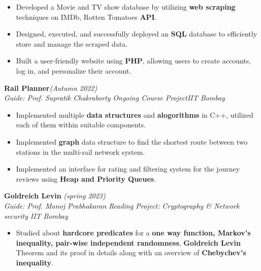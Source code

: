 \documentclass[10 pt]{article}
\begin{document}
		\begin{itemize}[itemsep = -0.8 mm, leftmargin=*]
		\vspace{-16pt}
		\item Developed a Movie and TV show database by utilizing \textbf{web scraping} techniques on IMDb, Rotten Tomatoes \textbf{API}.
		\item Designed, executed, and successfully deployed an \textbf{SQL} database to efficiently store and manage the scraped data.
		\item Built a user-friendly website using \textbf{PHP}, allowing users to create accounts, log in, and personalize their account.
	\end{itemize}
{\selectfont
		\textbf{{Rail Planner}}\hfill{\sl \small (Autumn 2022)}\\
	}{\it Guide: Prof. Supratik Chakraborty \textbar} {\it Ongoing Course Project}\hfill{\sl \small IIT Bombay}\\
	\begin{itemize}[itemsep = -0.8 mm, leftmargin=*]
		\vspace{-16pt}
		\item Implemented multiple \textbf{data structures} and \textbf{alogorithms} in C++, utilized each of them within suitable components.
\item Implemented {\bf graph} data structure to find the shortest route between two stations in the multi-rail network system.
\item Implemented an interface for rating and filtering system for the journey reviews using \textbf{Heap and Priority Queues}.
	\end{itemize}
  	{\selectfont
		\textbf{{Goldreich Levin }}\hfill{\sl \small (spring 2023)}\\
	}{\it Guide: Prof. Manoj Prabhakaran \textbar} {\it Reading Project:  Cryptography \& Network security }\hfill{\sl \small IIT Bombay}\\
	\begin{itemize}[itemsep = -0.8 mm, leftmargin=*]
		\vspace{-16pt}
		\item  Studied about \textbf{hardcore predicates} for a \textbf{one way function, Markov’s inequality, pair-wise
independent randomness}, \textbf{Goldreich Levin} Theorem and its
proof in details along with an overview of \textbf{Chebychev’s inequality}.
	\end{itemize}
 \vspace{-16pt}
\end{document}
